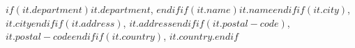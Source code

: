 $if(it.department)$$it.department$, $endif$$if(it.name)$$it.name$$endif$$if(it.city)$, $it.city$$endif$$if(it.address)$, $it.address$$endif$$if(it.postal-code)$, $it.postal-code$$endif$$if(it.country)$, $it.country$.$endif$
